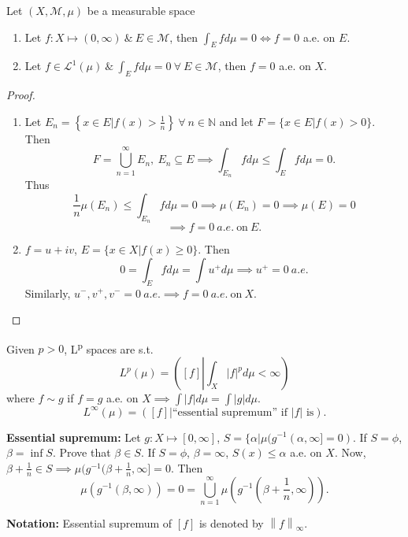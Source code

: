\documentclass{functionspaces}
\begin{document}
\begin{theorem}\label{thm:integral_zero_implies_zero_ae}
Let $(X,\mathcal{M},\mu)$ be a measurable space
\begin{enumerate}
\item Let $f:X\mapsto(0,\infty)\ \&\ E\in\mathcal{M}$, then $\int_{E}fd\mu=0\iff f=0$ a.e. on $E$.
\item Let $f\in\mathcal{L}^{1}(\mu)\ \&\ \int_{E}fd\mu=0\ \forall\ E\in\mathcal{M}$, then $f=0$ a.e. on $X$.
\end{enumerate}
\end{theorem}

\begin{proof}
\begin{enumerate}
\item Let $E_{n}=\left\{x\in E|f(x)>\frac{1}{n}\right\}\ \forall\ n\in\mathbb{N}$ and let $F=\{x\in E|f(x)>0\}$. Then
\[
F=\bigcup_{n=1}^{\infty}E_{n},\ E_{n}\subseteq E\implies\int_{E_{n}}fd\mu\leq\int_{E}fd\mu=0.
\]
Thus
\[
\frac{1}{n}\mu(E_{n})\leq\int_{E_{n}}fd\mu=0\implies\mu(E_{n})=0\implies\mu(E)=0
\]
\[
\implies f=0\ a.e.\ \text{on}\ E.
\]

\item $f=u+iv$, $E=\{x\in X|f(x)\geq 0\}$. Then
\[
0=\int_{E}fd\mu=\int u^{+}d\mu\implies u^{+}=0\ a.e.
\]
Similarly, $u^{-},v^{+},v^{-}=0\ a.e.\implies f=0\ a.e.\ \text{on}\ X$.
\end{enumerate}
\end{proof}

\begin{definition}\label{def:Lp_spaces}
Given $p>0$, L\textsuperscript{p} spaces are s.t.
\[
L^{p}(\mu)=\left(\left[f\right]\left|\int_{X}\left|f\right|^{p}d\mu<\infty\right.\right)
\]
where $f\sim g$ if $f=g$ a.e. on $X\implies\int\left|f\right|d\mu=\int\left|g\right|d\mu$.
\[
L^{\infty}(\mu)=\left(\left[f\right]\left|\text{``essential supremum'' if }|f|\text{ is}\right.\right).
\]
\end{definition}

\textbf{Essential supremum:} Let $g:X\mapsto[0,\infty]$, $S=\{\alpha|\mu(g^{-1}(\alpha,\infty]=0)$. If $S=\phi$, $\beta=\inf S$. Prove that $\beta\in S$. If $S=\phi$, $\beta=\infty$, $S(x)\leq\alpha$ a.e. on $X$. Now, $\beta+\frac{1}{n}\in S\implies\mu(g^{-1}(\beta+\frac{1}{n},\infty]=0$. Then
\[
\mu(g^{-1}(\beta,\infty))=0=\bigcup_{n=1}^{\infty}\mu(g^{-1}(\beta+\frac{1}{n},\infty)).
\]

\textbf{Notation:} Essential supremum of $\left[f\right]$ is denoted by $\left\|f\right\|_{\infty}$.
\end{document}
